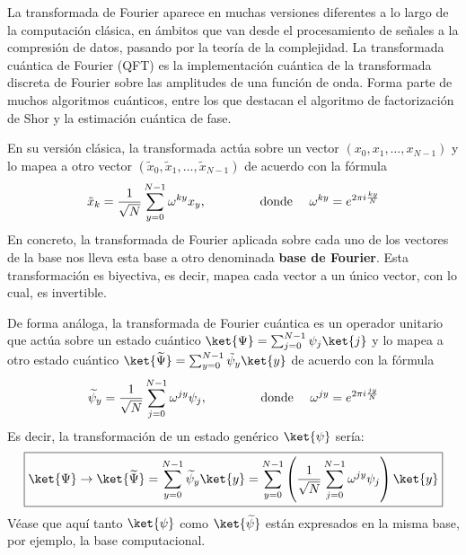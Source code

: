 \documentclass[a4paper,11pt]{book} %
\numberwithin{equation}{chapter}
\def\lp{\left(}
\def\rp{\right)}
\begin{document}
La transformada de Fourier aparece en muchas versiones diferentes a lo largo de la computación clásica, en ámbitos que van desde el procesamiento de señales a la compresión de datos, pasando por la teoría de la complejidad. La transformada cuántica de Fourier (QFT) es la implementación cuántica de la transformada discreta de Fourier sobre las amplitudes de una función de onda. Forma parte de muchos algoritmos cuánticos, entre los que destacan el algoritmo de factorización de Shor y la estimación cuántica de fase.

En su versión clásica, la transformada actúa sobre un vector $(x_0, x_1, \dots, x_{N-1})$ y lo mapea a otro vector $(\tilde{x}_0, \tilde{x}_1, \dots, \tilde{x}_{N-1})$ de acuerdo con la fórmula
	\begin{equation} \label{ec_QFT_clasica}
	\tilde{x}_k = \frac{1}{\sqrt{N}} \sum_{y=0}^{N-1} \omega^{ky} x_y, \hspace{1.5cm} \text{donde } \quad \omega^{ky}= e^{2\pi i \frac{ky}{N}}
	\end{equation}
 En concreto, la transformada de Fourier aplicada sobre cada uno de los vectores de la base nos lleva esta base a otro denominada \textbf{base de Fourier}. Esta transformación es biyectiva, es decir, mapea cada vector a un único vector, con lo cual, es invertible.

De forma análoga, la transformada de Fourier cuántica es un operador unitario que actúa sobre un estado cuántico $ \ket{\Psi} = \sum_{j=0}^{N-1} \psi_j \ket{j}$ y lo mapea a otro estado cuántico $\ket{\widetilde{\Psi}} = \sum_{y=0}^{N-1} \tilde{\psi}_y \ket{y}$ de acuerdo con la fórmula
	\begin{equation}
	\widetilde{\psi}_y = \frac{1}{\sqrt{N}} \sum_{j=0}^{N-1} \omega^{jy} \psi_j, \hspace{1.5cm} \text{donde } \quad \omega^{jy} = e^{2\pi i \frac{jy}{N}}
	\end{equation}
Es decir, la transformación de un estado genérico $\ket{\psi}$ sería:
	\begin{equation} \label{ec_QFT_sobre_Psi}
	\boxed{\ket{\Psi} \to \ket{\widetilde{\Psi}} = \sum_{y=0}^{N-1} \widetilde{\psi}_y \ket{y} =  \sum_{y=0}^{N-1} \lp \frac{1}{\sqrt{N}} \sum_{j=0}^{N-1} \omega^{jy} \psi_j \rp \ket{y}}
	\end{equation}	
Véase que aquí tanto $\ket{\psi}$ como $\ket{\widetilde{\psi}}$ están expresados en la misma base, por ejemplo, la base computacional.
\end{document}
